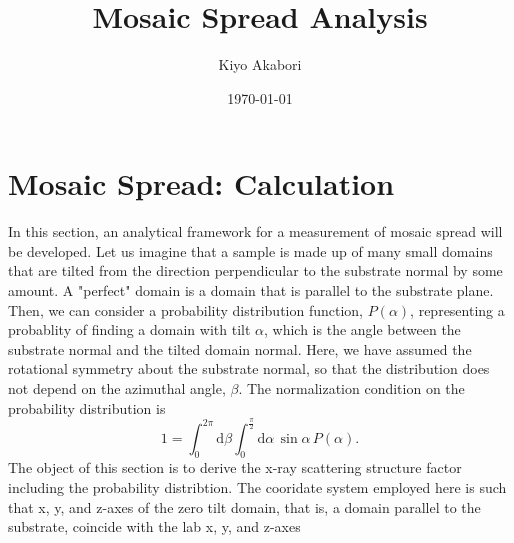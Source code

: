 \documentclass[12pt,letterpaper]{article}
\author{Kiyo Akabori}
\title{Mosaic Spread Analysis}
\date{\today}
\begin{document}
\maketitle



\section{Mosaic Spread: Calculation}
In this section, an analytical framework for a measurement of mosaic spread will 
be developed. Let us imagine that a sample is made up of many small domains 
that are 
tilted from the direction perpendicular to the substrate normal by some amount. 
A "perfect" domain is a domain that is parallel to the substrate plane.
Then, we can consider a probability distribution function, $P(\alpha)$, 
representing a probablity of finding a domain with tilt $\alpha$, which is the 
angle
between the substrate normal and the tilted domain normal. Here, we have
assumed the rotational symmetry about the substrate normal, so that the 
distribution
does not depend on the azimuthal angle, $\beta$. The normalization condition on 
the probability distribution is 
\begin{equation}
  1 = \int_0^{2\pi} \!\! \mathrm{d}\beta  
      \int_0^{\frac{\pi}{2}} \! \mathrm{d}\alpha \, \sin\alpha \, P(\alpha).
\end{equation}
The object of this section is to derive the x-ray scattering structure factor 
including the probability distribtion. The cooridate system employed here is 
such that x, y, and
z-axes of the zero tilt domain, that is, a domain parallel to the substrate, 
coincide with the lab x, y, and z-axes 
\end{document}
